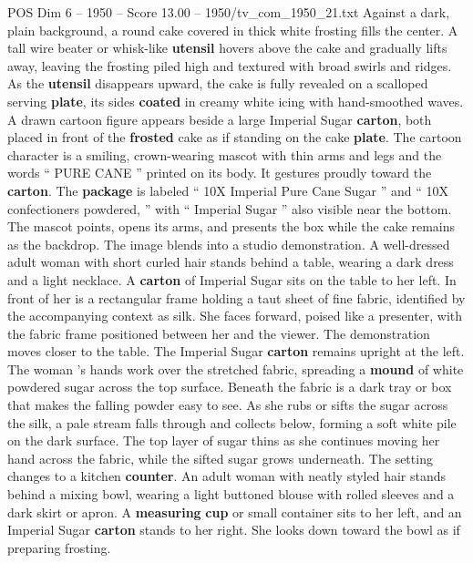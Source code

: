 \begin{textsample}{POS Dim 6 – 1950 – Score 13.00 – 1950/tv\_com\_1950\_21.txt}  \label{ex:f6_pos_011}
Against a dark, plain background, a round cake covered in thick white frosting fills the center.
A tall wire beater or whisk-like \textbf{utensil} hovers above the cake and gradually lifts away, leaving the frosting piled high and textured with broad swirls and ridges.
As the \textbf{utensil} disappears upward, the cake is fully revealed on a scalloped serving \textbf{plate}, its sides \textbf{coated} in creamy white icing with hand-smoothed waves.
A drawn cartoon figure appears beside a large Imperial Sugar \textbf{carton}, both placed in front of the \textbf{frosted} cake as if standing on the cake \textbf{plate}.
The cartoon character is a smiling, crown-wearing mascot with thin arms and legs and the words “ PURE CANE ” printed on its body.
It gestures proudly toward the \textbf{carton}.
The \textbf{package} is labeled “ 10X Imperial Pure Cane Sugar ” and “ 10X confectioners powdered, ” with “ Imperial Sugar ” also visible near the bottom.
The mascot points, opens its arms, and presents the box while the cake remains as the backdrop.
The image blends into a studio demonstration.
A well-dressed adult woman with short curled hair stands behind a table, wearing a dark dress and a light necklace.
A \textbf{carton} of Imperial Sugar sits on the table to her left.
In front of her is a rectangular frame holding a taut sheet of fine fabric, identified by the accompanying context as silk.
She faces forward, poised like a presenter, with the fabric frame positioned between her and the viewer.
The demonstration moves closer to the table.
The Imperial Sugar \textbf{carton} remains upright at the left.
The woman ’s hands work over the stretched fabric, spreading a \textbf{mound} of white powdered sugar across the top surface.
Beneath the fabric is a dark tray or box that makes the falling powder easy to see.
As she rubs or sifts the sugar across the silk, a pale stream falls through and collects below, forming a soft white pile on the dark surface.
The top layer of sugar thins as she continues moving her hand across the fabric, while the sifted sugar grows underneath.
The setting changes to a kitchen \textbf{counter}.
An adult woman with neatly styled hair stands behind a mixing bowl, wearing a light buttoned blouse with rolled sleeves and a dark skirt or apron.
A \textbf{measuring} \textbf{cup} or small container sits to her left, and an Imperial Sugar \textbf{carton} stands to her right.
She looks down toward the bowl as if preparing frosting.

\end{textsample}
